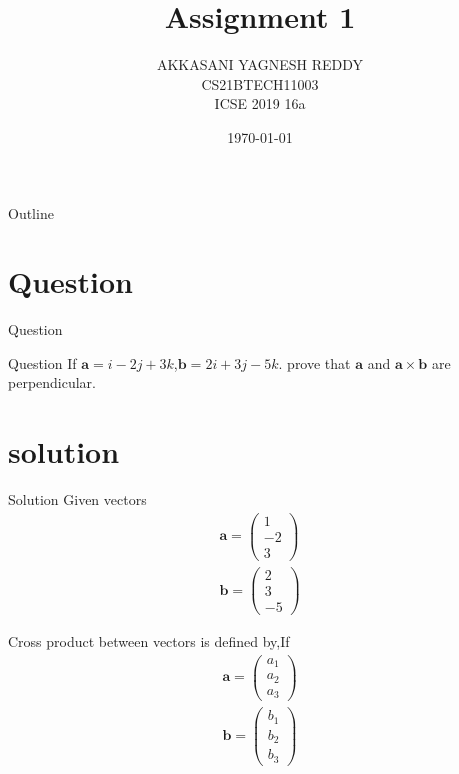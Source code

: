 \documentclass{beamer}
\title{Assignment 1}
\author{AKKASANI YAGNESH REDDY \\
     CS21BTECH11003 \\
     ICSE 2019 16a}
\date{\today}
\let\vec\mathbf
\newcommand{\myvec}[1]{\ensuremath{\begin{pmatrix}#1\end{pmatrix}}}
\begin{document}
     \begin{frame}
         \maketitle
     \end{frame}
      \logo{}
     
     \begin{frame}{Outline}
    \tableofcontents
     \end{frame}
     
   \section{Question}
   \begin{frame}{Question}
   \begin{block}{Question}
   If $\vec{a}=i-2j+3k$,$\vec{b}=2i+3j-5k$. prove that $\vec{a}$ and $\vec{a}\times\vec{b}$ are perpendicular.\\
   \end{block}
   \end{frame}
   
   \section{solution}
   \begin{frame}{Solution}
   Given vectors
    \begin{align}
        \vec{a}=\myvec{1\\-2\\3} \\
        \vec{b}=\myvec{2\\3\\-5}
    \end{align}
    
    Cross product between vectors is defined by,If
    \begin{align}
        \vec{a}=\myvec{a_{1}\\a_{2}\\a_{3}}\\
        \vec{b}=\myvec{b_{1}\\b_{2}\\b_{3}}
    \end{align}
       \end{frame}
       
\end{document}
